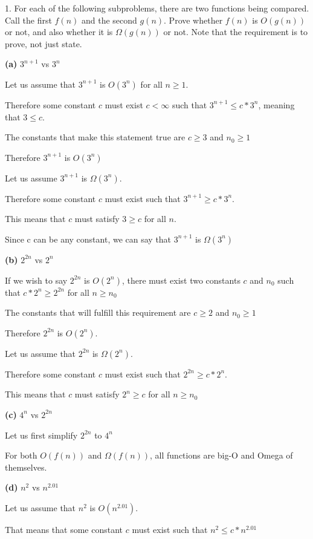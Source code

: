 \documentclass[12pt]{report}
\begin{document}
1. For each of the following subproblems, 
there are two functions being compared. 
Call the first $f(n)$ and the second $g(n)$. 
Prove whether $f(n)$ is $O(g(n))$ or not, 
and also whether it is $\Omega(g(n))$ or not.
Note that the requirement is to prove, not just state.

\textbf{(a)} $3^{n+1}$ vs $3^n$

Let us assume that $3^{n+1}$ is $O(3^n)$ for all $n \geq 1$.

Therefore some constant $c$ must exist $c < \infty$ such that $3^{n+1} \leq c * 3^n$, meaning that $3 \leq c$.

The constants that make this statement true are $c \geq 3$ and $n_0 \geq 1$

Therefore $3^{n+1}$ is $O(3^n)$

Let us assume $3^{n+1}$ is $\Omega(3^n)$.

Therefore some constant $c$ must exist such that $3^{n+1} \geq c * 3^n$.

This means that $c$ must satisfy $3 \geq c$ for all $n$.

Since c can be any constant, we can say that $3^{n+1}$ is $\Omega(3^n)$

\textbf{(b)} $2^{2n}$ vs $2^n$

If we wish to say $2^{2n}$ is $O(2^n)$, there must exist
two constants $c$ and $n_0$ such that $c*2^n \geq 2^{2n}$
for all $n \geq n_0$

The constants that will fulfill this requirement are $c\geq 2$
and $n_0 \geq 1$

Therefore $2^{2n}$ is $O(2^n)$.

Let us assume that $2^{2n}$ is $\Omega(2^n)$.

Therefore some constant $c$ must exist such that $2^{2n} \geq c * 2^n$.

This means that $c$ must satisfy $2^n \geq c$ for all $n \geq n_0$

\pagebreak

\textbf{(c)} $4^n$ vs $2^{2n}$

Let us first simplify $2^{2n}$ to $4^n$

For both $O(f(n))$ and $\Omega(f(n))$, all functions are
big-O and Omega of themselves.

\textbf{(d)} $n^2$ vs $n^{2.01}$

Let us assume that $n^2$ is $O(n^{2.01})$.

That means that some constant $c$ must exist such that $n^2 \leq c * n^{2.01}$
\end{document}
